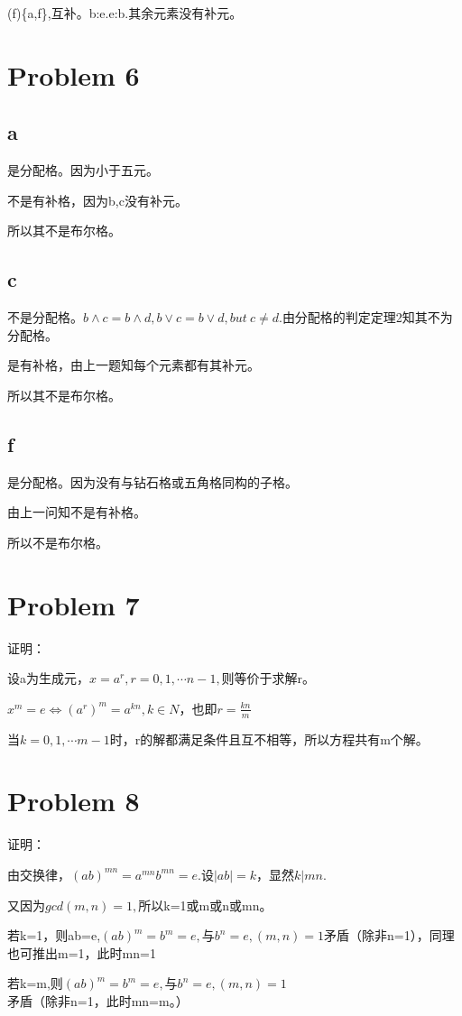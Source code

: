 \documentclass{article}
\begin{document}
(f)\{a,f\},互补。b:e.e:b.其余元素没有补元。

\section*{Problem 6}
\subsection*{a}
是分配格。因为小于五元。

不是有补格，因为b,c没有补元。

所以其不是布尔格。

\subsection*{c}
不是分配格。$b\wedge c=b\wedge d,b\vee c=b\vee d,but\ c\neq d.$由分配格的判定定理2知其不为分配格。

是有补格，由上一题知每个元素都有其补元。

所以其不是布尔格。

\subsection*{f}
是分配格。因为没有与钻石格或五角格同构的子格。

由上一问知不是有补格。

所以不是布尔格。
\section*{Problem 7}
证明：

设a为生成元，$x=a^{r},r=0,1,\cdots n-1,$则等价于求解r。

$x^m=e \Leftrightarrow (a^r)^{m}=a^{kn},k\in N$，也即$r=\frac{kn}{m}$

当$k=0,1,\cdots m-1$时，r的解都满足条件且互不相等，所以方程共有m个解。

\section*{Problem 8}
证明：

由交换律，$(ab)^{mn}=a^{mn}b^{mn}=e.$设$|ab|=k$，显然$k|mn.$

又因为$gcd(m,n)=1,$所以k=1或m或n或mn。

若k=1，则ab=e,$(ab)^{m}=b^m=e,$与$b^n=e,(m,n)=1$矛盾（除非n=1），同理也可推出m=1，此时mn=1

若k=m,则$(ab)^{m}=b^m=e,$与$b^n=e,(m,n)=1$矛盾（除非n=1，此时mn=m。）
\end{document}
